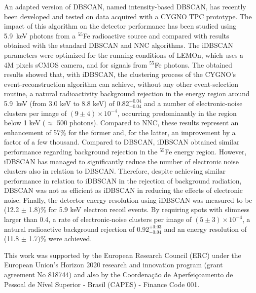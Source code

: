 \documentclass[a4paper,11pt]{article}
\begin{document}
An adapted version of DBSCAN, named intensity-based DBSCAN, has recently been developed and tested on data acquired with a CYGNO TPC prototype. The impact of this algorithm on the detector performance has been studied using 5.9~keV photons from a $^{55}$Fe radioactive source and compared with results obtained with the standard DBSCAN and NNC algorithms.
The iDBSCAN parameters were optimized for the running conditions of LEMOn, which uses a 4M pixels sCMOS camera, and for signals from $^{55}$Fe photons.
The obtained results showed that, with iDBSCAN, the clustering process of the CYGNO's event-reconstruction algorithm can achieve, without any other event-selection routine, a natural radioactivity background rejection in the energy region around 5.9~keV (from 3.0 keV to 8.8 keV) of 0.82$^{+0.04}_{-0.04}$ and a number of electronic-noise clusters per image of $(9 \pm 4)\times 10^{-4}$, occurring predominantly in the region below 1 keV ($\approx$ 500 photons).
Compared to NNC, these results represent an enhancement of 57\% for the former and, for the latter, an improvement by a factor of a few thousand. 
Compared to DBSCAN, iDBSCAN obtained similar performance regarding background rejection in the $^{55}$Fe energy region.
However, iDBSCAN has managed to significantly reduce the number of electronic noise clusters also in relation to DBSCAN.
Therefore, despite achieving similar performance in relation to iDBSCAN in the rejection of background radiation, DBSCAN was not as efficient as iDBSCAN in reducing the effects of electronic noise.
Finally, the detector energy resolution using iDBSCAN was measured to be (12.2 $\pm$ 1.8)\% for 5.9 keV electron recoil events. By requiring spots with slimness larger than 0.4, a rate of electronic-noise clusters per image of $(5 \pm 3)\times 10^{-4}$, a natural radioactive background rejection of 0.92$^{+0.03}_{-0.04}$ and an energy resolution of (11.8 $\pm$ 1.7)\% were achieved.

\acknowledgments
This work was supported by the European Research Council (ERC) under the European Union’s Horizon 2020 research and innovation program (grant agreement No 818744) and also by the Coordenação de Aperfeiçoamento de Pessoal de Nível Superior - Brasil (CAPES) - Finance Code 001.




\end{document}

